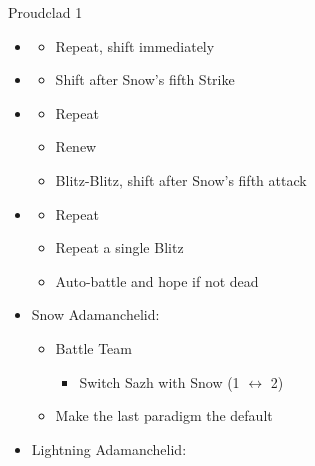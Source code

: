 \begin{multicols}{2}
\begin{battle}{Proudclad 1}
\begin{itemize}
    \item \fifth
          \begin{itemize}
            \item Repeat, shift immediately
          \end{itemize}
    \item \sixth
          \begin{itemize}
            \item Shift after Snow's fifth Strike
          \end{itemize}
    \item \first
          \begin{itemize}
            \item Repeat
            \item Renew
            \item Blitz-Blitz, shift after Snow's fifth attack
          \end{itemize}
    \item \second
          \begin{itemize}
            \item Repeat
            \item Repeat a single Blitz
            \item Auto-battle and hope if not dead
          \end{itemize}
  \end{itemize}
\end{battle}
\vfill
\begin{menu}
  \begin{itemize}
    \item Snow Adamanchelid:
          \begin{itemize}
            \paradigm
            \begin{itemize}
              \item Battle Team
                    \begin{itemize}
                      \item Switch Sazh with Snow (1 $\leftrightarrow$ 2)
                    \end{itemize}
              \item Make the last paradigm the default
            \end{itemize}
          \end{itemize}
    \item Lightning Adamanchelid:
          \begin{itemize}
            \paradigm
            \begin{itemize}

\end{itemize}
\end{itemize}
\end{itemize}
\end{menu}
\end{multicols}
